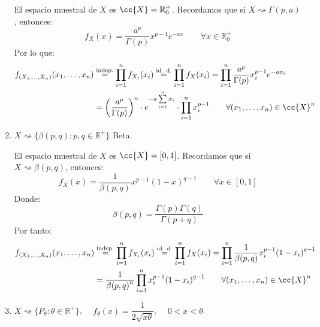 \begin{ejercicio}
\begin{enumerate}[label=\alph*)]
            El espacio muestral de $X$ es $\cc{X}=\mathbb{R}^+_0$. Recordamos que si $X\rightsquigarrow \Gamma(p,a)$, entonces:
            \begin{equation*}
                f_X(x) = \dfrac{a^p}{\Gamma(p)} x^{p-1} e^{-ax} \qquad \forall x\in \mathbb{R}^+_0
            \end{equation*}
            Por lo que:
            \begin{align*}
                f_{(X_1, \ldots, X_n)}(x_1, \ldots, x_n) &\stackrel{\text{indep.}}{=} \prod_{i=1}^{n} f_{X_i}(x_i) \stackrel{\text{id. d.}}{=} \prod_{i=1}^{n} f_X(x_i) 
                = \prod_{i=1}^{n} \dfrac{a^p}{\Gamma(p)} x_i^{p-1} e^{-ax_i} \\
                                                         &= {\left(\dfrac{a^p}{\Gamma(p)}\right)}^{n} \cdot e^{-a\sum\limits_{i=1}^n x_i} \cdot \prod_{i=1}^{n} x_i^{p-1} \qquad \forall (x_1,\ldots,x_n)\in \cc{X}^n
            \end{align*}
        \item $X\rightsquigarrow\{\beta(p,q) : p,q\in \mathbb{R}^+\}$ Beta.

            El espacio muestral de $X$ es $\cc{X} = [0,1]$. Recordamos que si $X\rightsquigarrow \beta(p,q)$, entonces:
            \begin{equation*}
                f_X(x) = \dfrac{1}{\beta(p,q)} x^{p-1} {(1-x)}^{q-1} \qquad \forall x\in [0,1]
            \end{equation*}
            Donde:
            \begin{equation*}
                \beta(p,q) = \dfrac{\Gamma(p)\Gamma(q)}{\Gamma(p+q)}
            \end{equation*}
            Por tanto:
            \begin{align*}
                f_{(X_1, \ldots, X_n)}(x_1, \ldots, x_n) &\stackrel{\text{indep.}}{=} \prod_{i=1}^{n} f_{X_i}(x_i) \stackrel{\text{id. d.}}{=} \prod_{i=1}^{n} f_X(x_i) 
                = \prod_{i=1}^{n} \dfrac{1}{\beta(p,q)} x_i^{p-1} {(1-x_i)}^{q-1} \\
                                                         &= \dfrac{1}{{\beta(p,q)}^{n}} \prod_{i=1}^{n}x_i^{p-1} {(1-x_i)}^{q-1} \qquad \forall (x_1,\ldots,x_n) \in \cc{X}^n
            \end{align*}
        \item $X\rightsquigarrow\{P_\theta : \theta \in \mathbb{R}^+\}$, $\quad f_\theta(x) = \dfrac{1}{2\sqrt{x\theta}}$, $\quad 0<x<\theta$.


\end{enumerate}
\end{ejercicio}
